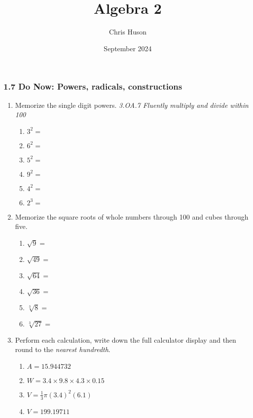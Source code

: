 \documentclass[12pt, twoside]{article}
\title{Algebra 2}
\author{Chris Huson}
\date{September 2024}
\begin{document}
\subsubsection*{1.7 Do Now: Powers, radicals, constructions}
\begin{enumerate}[itemsep=0.5cm]

\item Memorize the single digit powers. \hfill \emph{3.OA.7 Fluently multiply and divide within 100}
    \begin{multicols}{2}
        \begin{enumerate}[itemsep=0.5cm]
            \item $3^2 =$
            \item $6^2 =$
            \item $5^2 =$
            \item $9^2 =$
            \item $4^2 =$
            \item $2^3 =$
        \end{enumerate}
    \end{multicols}

\item Memorize the square roots of whole numbers through 100 and cubes through five.
    \begin{multicols}{2}
        \begin{enumerate}[itemsep=0.5cm]
            \item $\sqrt{9} =$
            \item $\sqrt{49} =$
            \item $\sqrt{64} =$
            \item $\sqrt{36} =$
            \item $\sqrt[3]{8} =$
            \item $\sqrt[3]{27} =$
          \end{enumerate}
    \end{multicols} \vspace{0.25cm}


\item Perform each calculation, write down the full calculator display and then round to the \emph{nearest hundredth}.
    \begin{multicols}{2}
    \begin{enumerate}[itemsep=1.5cm]
      \item $A=15.944732$
      \item $W=3.4 \times 9.8 \times 4.3 \times 0.15$
      \item $V=\frac{1}{3} \pi (3.4)^2(6.1)$
      \item $V=199.19711$
    \end{enumerate}
    \end{multicols} \vspace{1cm}


\end{enumerate}
\end{document}
